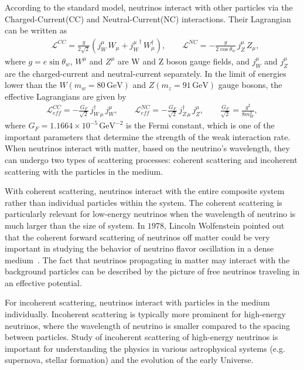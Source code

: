 According to the standard model, neutrinos interact with other particles via the Charged-Current(CC) and Neutral-Current(NC) interactions. Their Lagrangian can be written as~\cite{Giunti:2007ry}
\begin{align}
&\mathcal{L}^{CC}=\frac{g}{2\sqrt{2}}\left(j^\mu_W\,W_\mu+{j^\mu_W}^\dagger\,W^\dagger_\mu\right),\qquad\mathcal{L}^{NC}=-\frac{g}{2\cos{\theta_w}}\,j^\mu_Z\,Z_\mu,
\end{align}
where $g=e\sin\theta_w$, $W^\mu$ and $Z^\mu$ are W and Z boson gauge fields, and $j^\mu_W$ and $j^\mu_Z$ are the charged-current and neutral-current separately. In the limit of energies lower than the $W(m_w=80\,\mathrm{GeV})$ and $Z(m_z=91\,\mathrm{GeV})$ gauge bosons, the effective Lagrangians are given by
\begin{align}\label{L_low}
\mathcal{L}^{CC}_{eff}=-\frac{G_F}{\sqrt{2}}\,j^\dagger_{W\,\mu}\,j^\mu_W,\qquad
\mathcal{L}^{NC}_{eff}=-\frac{G_F}{\sqrt{2}}\,j^\dagger_{Z\,\mu}\,j^\mu_Z,\qquad \frac{G_F}{\sqrt{2}}=\frac{g^2}{8m^2_W},
\end{align}
where $G_F=1.1664\times10^{-5}\,\mathrm{GeV}^{-2}$ is the Fermi constant, which is one of the important parameters that determine the strength of the weak interaction rate. When neutrinos interact with matter, based on the neutrino's wavelength, they can undergo two types of scattering processes: coherent scattering and incoherent scattering with the particles in the medium. 

With coherent scattering, neutrinos interact with the entire  composite system rather than individual particles within the system. The coherent scattering is particularly relevant for low-energy neutrinos when the wavelength of neutrino is much larger than the size of system. In $1978$, Lincoln Wolfenstein pointed out that the coherent forward scattering of neutrinos off matter could be very important in studying the behavior of neutrino flavor oscillation in a dense medium~\cite{Wolfenstein:1977ue}. The fact that neutrinos propagating in matter may interact with the background particles can be described by the picture of free neutrinos traveling in an effective potential.

For incoherent scattering, neutrinos interact with particles in the medium individually. Incoherent scattering is typically more prominent for high-energy neutrinos, where the wavelength of neutrino is smaller compared to the spacing between particles. Study of incoherent scattering of high-energy neutrinos is important for understanding the physics in various astrophysical systems (e.g. supernova, stellar formation) and the evolution of the early Universe.

